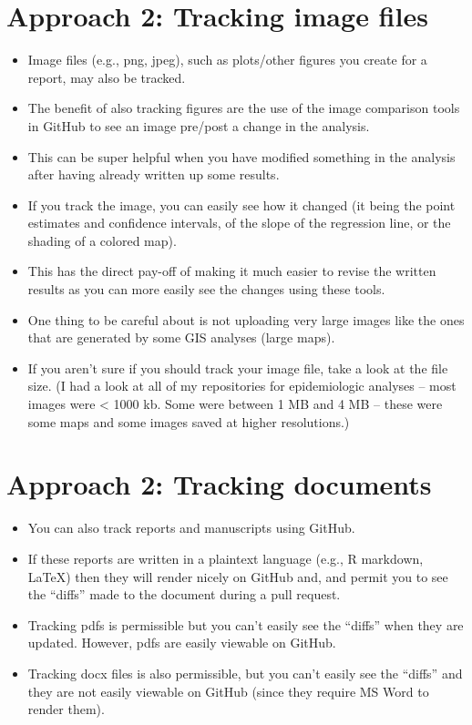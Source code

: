 \documentclass[
]{book}
\providecommand{\tightlist}{%
  \setlength{\itemsep}{0pt}\setlength{\parskip}{0pt}}
\begin{document}
\hypertarget{approach-2-tracking-image-files}{%
\section{Approach 2: Tracking image files}\label{approach-2-tracking-image-files}}

\begin{itemize}
\tightlist
\item
  Image files (e.g., png, jpeg), such as plots/other figures you create for a
  report, may also be tracked.
\item
  The benefit of also tracking figures are the use of the image
  comparison tools in GitHub to see an image pre/post a change in the analysis.
\item
  This can be super helpful when you have modified something in the analysis
  after having already written up some results.
\item
  If you track the image, you can
  easily see how it changed (it being the point estimates and confidence intervals,
  of the slope of the regression line, or the shading of a colored map).
\item
  This
  has the direct pay-off of making it much easier to revise the written results
  as you can more easily see the changes using these tools.
\item
  One thing to be careful about is not uploading very large images like the
  ones that are generated by some GIS analyses (large maps).
\item
  If you aren't sure if you should track your image file, take a look at the
  file size. (I had a look at all of my repositories for epidemiologic analyses --
  most images were \textless{} 1000 kb. Some were between 1 MB and 4 MB -- these were some
  maps and some images saved at higher resolutions.)
\end{itemize}

\hypertarget{approach-2-tracking-documents}{%
\section{Approach 2: Tracking documents}\label{approach-2-tracking-documents}}

\begin{itemize}
\tightlist
\item
  You can also track reports and manuscripts using GitHub.
\item
  If these reports are written in a plaintext language (e.g., R markdown, LaTeX)
  then they will render nicely on GitHub and, and permit you to see the ``diffs''
  made to the document during a pull request.
\item
  Tracking pdfs is permissible but you can't easily see the ``diffs'' when they are
  updated. However, pdfs are easily viewable on GitHub.
\item
  Tracking docx files is also permissible, but you can't easily see the ``diffs''
  and they are not easily viewable on GitHub (since they require MS Word to render
  them).
\end{itemize}
\end{document}
